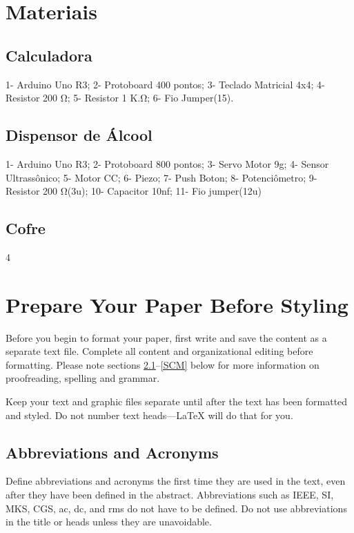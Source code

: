 \documentclass[conference]{IEEEtran}
\begin{document}
\section{Materiais}

\subsection{Calculadora}
1- Arduino Uno R3;
2- Protoboard 400 pontos;
3- Teclado Matricial 4x4;
4- Resistor 200 Ω;
5- Resistor 1 K.Ω;
6- Fio Jumper(15).

\subsection{Dispensor de Álcool}
1- Arduino Uno R3;
2- Protoboard 800 pontos;
3- Servo Motor 9g;
4- Sensor Ultrassônico;
5- Motor CC;
6- Piezo;
7- Push Boton;
8- Potenciômetro;
9- Resistor 200 Ω(3u);
10- Capacitor 10nf;
11- Fio jumper(12u)

\subsection{Cofre}4



\section{Prepare Your Paper Before Styling}
Before you begin to format your paper, first write and save the content as a 
separate text file. Complete all content and organizational editing before 
formatting. Please note sections \ref{AA}--\ref{SCM} below for more information on 
proofreading, spelling and grammar.

Keep your text and graphic files separate until after the text has been 
formatted and styled. Do not number text heads---{\LaTeX} will do that 
for you.

\subsection{Abbreviations and Acronyms}\label{AA}
Define abbreviations and acronyms the first time they are used in the text, 
even after they have been defined in the abstract. Abbreviations such as 
IEEE, SI, MKS, CGS, ac, dc, and rms do not have to be defined. Do not use 
abbreviations in the title or heads unless they are unavoidable.
\end{document}

